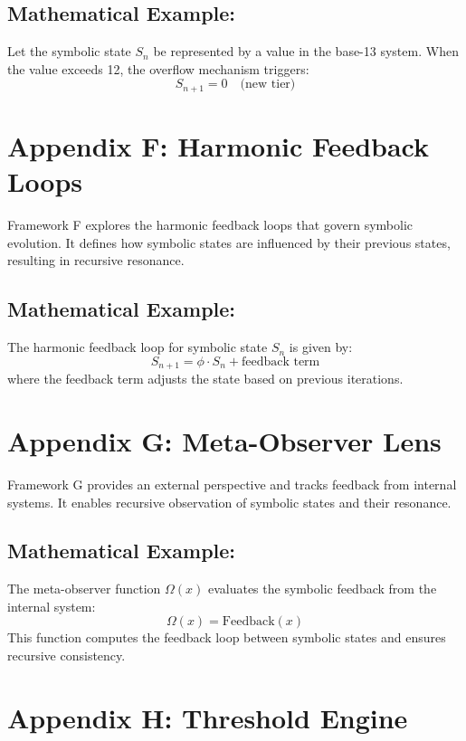 \documentclass[12pt]{article}
\begin{document}
\subsection*{Mathematical Example:}
Let the symbolic state $S_n$ be represented by a value in the base-13 system. When the value exceeds 12, the overflow mechanism triggers:
\[
S_{n+1} = 0 \quad \text{(new tier)} 
\]

\newpage

\section*{Appendix F: Harmonic Feedback Loops}

Framework F explores the harmonic feedback loops that govern symbolic evolution. It defines how symbolic states are influenced by their previous states, resulting in recursive resonance.

\subsection*{Mathematical Example:}
The harmonic feedback loop for symbolic state $S_n$ is given by:
\[
S_{n+1} = \phi \cdot S_n + \text{feedback term}
\]
where the feedback term adjusts the state based on previous iterations.

\newpage

\section*{Appendix G: Meta-Observer Lens}

Framework G provides an external perspective and tracks feedback from internal systems. It enables recursive observation of symbolic states and their resonance.

\subsection*{Mathematical Example:}
The meta-observer function $\Omega(x)$ evaluates the symbolic feedback from the internal system:
\[
\Omega(x) = \text{Feedback}(x)
\]
This function computes the feedback loop between symbolic states and ensures recursive consistency.

\newpage

\section*{Appendix H: Threshold Engine}
\end{document}
